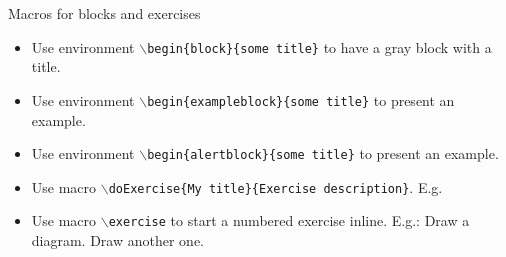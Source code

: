 \documentclass{beamer}
\begin{document}
\begin{slide}{Macros for blocks and exercises}
	\begin{itemize}
    \item Use environment \alert{\texttt{$\backslash$begin\{block\}\{some title\}}} to have a gray block with a title.

    \item Use environment \alert{\texttt{$\backslash$begin\{exampleblock\}\{some title\}}} to present an example.

    \item Use environment \alert{\texttt{$\backslash$begin\{alertblock\}\{some title\}}} to present an example.

    \item Use macro \alert{\texttt{$\backslash$doExercise\{My title\}\{Exercise description\}}}.
    E.g.

    \item Use macro \alert{\texttt{$\backslash$exercise}} to start a numbered exercise inline.
    E.g.: \exercise Draw a diagram. \exercise Draw another one.

  \end{itemize}
  
\end{slide}
\end{document}

